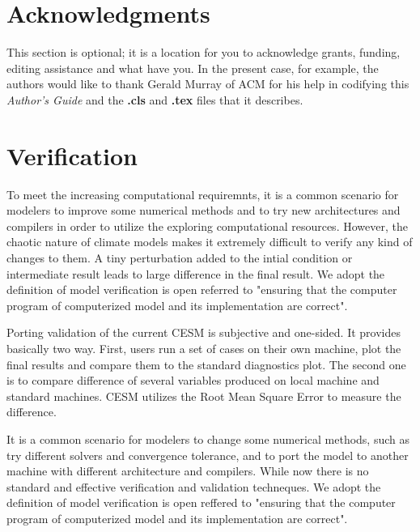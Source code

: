 \documentclass{sig-alternate}
\begin{document}
\section{Acknowledgments}
This section is optional; it is a location for you
to acknowledge grants, funding, editing assistance and
what have you.  In the present case, for example, the
authors would like to thank Gerald Murray of ACM for
his help in codifying this \textit{Author's Guide}
and the \textbf{.cls} and \textbf{.tex} files that it describes.

%

%
%
\section{Verification} \label{se:ver}
To meet the increasing computational requiremnts, it is a common scenario for modelers to improve some numerical methods and to try new architectures and compilers in order to utilize the exploring computational resources. 
However, the chaotic nature of climate models makes it extremely difficult to verify any kind of changes to them. A tiny perturbation added to the intial condition or intermediate result leads to large difference in the final result.
We adopt the definition of model verification is open referred to "ensuring that the computer program of computerized model and its implementation are correct"\cite{sargent2005verification}.


Porting validation of the current CESM is subjective and one-sided\cite{vertenstein2011cesm1}.
It provides basically two way. 
First, users run a set of cases on their own machine, plot the final results and compare them to the standard diagnostics plot. 
The second one is to compare difference of several variables produced on local machine and standard machines. 
CESM utilizes the Root Mean Square Error to measure the difference.

It is a common scenario for modelers to change some numerical methods, such as try different solvers and convergence tolerance, and to port the model to another machine with different architecture and compilers. While now there is no standard and effective verification and validation techneques.  
We adopt the definition of model verification is open reffered to "ensuring that the computer program of computerized model and its implementation are correct". \\
\end{document}
